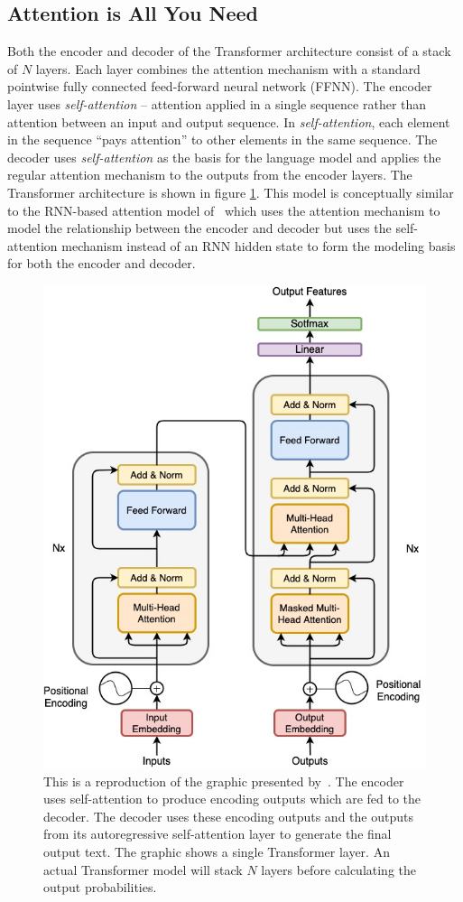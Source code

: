 \subsection{Attention is All You Need}
Both the encoder and decoder of the Transformer architecture consist of a stack of $N$ layers. Each layer combines the attention mechanism with a standard pointwise fully connected feed-forward neural network (FFNN). The encoder layer uses \emph{self-attention} -- attention applied in a single sequence rather than attention between an input and output sequence. In \emph{self-attention}, each element in the sequence ``pays attention'' to other elements in the same sequence. The decoder uses \emph{self-attention} as the basis for the language model and applies the regular attention mechanism to the outputs from the encoder layers. The Transformer architecture is shown in figure \ref{fig:transformer_architecture}. This model is conceptually similar to the RNN-based attention model of~\citet{bahdanau2014neural} which uses the attention mechanism to model the relationship between the encoder and decoder but uses the self-attention mechanism instead of an RNN hidden state to form the modeling basis for both the encoder and decoder. 

\begin{figure}[hb]
    \centering
    \includegraphics[width=0.6\linewidth]{figs/ch3/transformer_architecture.jpg}
    \caption{This is a reproduction of the graphic presented by~\cite{vaswani2017attention}. The encoder uses self-attention to produce encoding outputs which are fed to the decoder. The decoder uses these encoding outputs and the outputs from its autoregressive self-attention layer to generate the final output text. The graphic shows a single Transformer layer. An actual Transformer model will stack $N$ layers before calculating the output probabilities. }
    \label{fig:transformer_architecture}
\end{figure}

